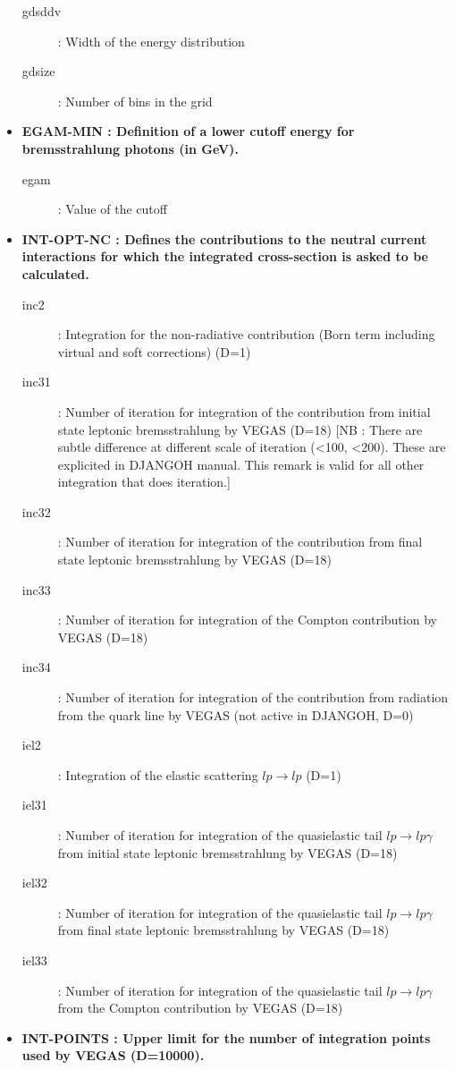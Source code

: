 \documentclass[letterpaper,12pt]{article}
\begin{document}
\begin{itemize}
\begin{description}
\item[gdsddv] : Width of the energy distribution
\item[gdsize] : Number of bins in the grid
\end{description}
\item \textbf{EGAM-MIN : Definition of a lower cutoff energy for bremsstrahlung photons (in GeV).}
\begin{description}
\item[egam] : Value of the cutoff
\end{description}
\item \textbf{INT-OPT-NC : Defines the contributions to the neutral current interactions for which
the integrated cross-section is asked to be calculated.}
\begin{description}
\item[inc2] : Integration for the non-radiative contribution (Born term including virtual and soft corrections) (D=1)
\item[inc31] : Number of iteration for integration of the contribution from initial state leptonic bremsstrahlung by VEGAS (D=18)
[NB : There are subtle difference at different scale of iteration (<100, <200). These are explicited in DJANGOH manual. This remark
is valid for all other integration that does iteration.]
\item[inc32] : Number of iteration for integration of the contribution from final state leptonic bremsstrahlung by VEGAS (D=18)
\item[inc33] : Number of iteration for integration of the Compton contribution by VEGAS (D=18)
\item[inc34] : Number of iteration for integration of the contribution from radiation from the quark line by VEGAS (not active in DJANGOH, D=0)
\item[iel2] : Integration of the elastic scattering $lp\rightarrow lp$ (D=1)
\item[iel31] : Number of iteration for integration of the quasielastic tail $lp\rightarrow lp\gamma$ from initial state leptonic bremsstrahlung by VEGAS (D=18)
\item[iel32] : Number of iteration for integration of the quasielastic tail $lp\rightarrow lp\gamma$ from final state leptonic bremsstrahlung by VEGAS (D=18)
\item[iel33] : Number of iteration for integration of the quasielastic tail $lp\rightarrow lp\gamma$ from the Compton contribution by VEGAS (D=18)
\end{description}
\item \textbf{INT-POINTS : Upper limit for the number of integration points used by VEGAS (D=10000).}

\end{itemize}
\end{document}
